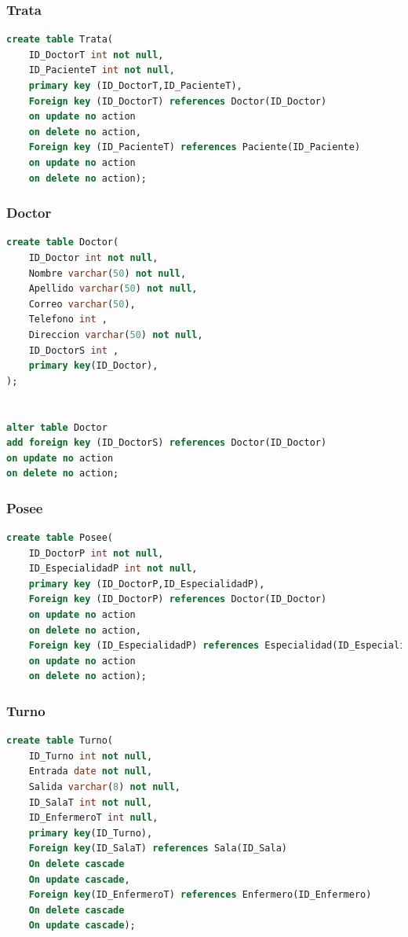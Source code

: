 \documentclass[10pt,letterpaper]{book}
\begin{document}
\subsubsection{Trata}
\begin{lstlisting}[language=sql]
create table Trata(
	ID_DoctorT int not null,
	ID_PacienteT int not null,
	primary key (ID_DoctorT,ID_PacienteT),
	Foreign key (ID_DoctorT) references Doctor(ID_Doctor)
	on update no action
	on delete no action,
	Foreign key (ID_PacienteT) references Paciente(ID_Paciente)
	on update no action
	on delete no action);
\end{lstlisting}
\subsubsection{Doctor}
\begin{lstlisting}[language=sql]
create table Doctor(
	ID_Doctor int not null,
	Nombre varchar(50) not null,
	Apellido varchar(50) not null,
	Correo varchar(50),
	Telefono int ,
	Direccion varchar(50) not null,
	ID_DoctorS int ,
	primary key(ID_Doctor),
);


alter table Doctor
add foreign key (ID_DoctorS) references Doctor(ID_Doctor)
on update no action
on delete no action;
\end{lstlisting}
\subsubsection{Posee}
\begin{lstlisting}[language=sql]
create table Posee(
	ID_DoctorP int not null,
	ID_EspecialidadP int not null,
	primary key (ID_DoctorP,ID_EspecialidadP),
	Foreign key (ID_DoctorP) references Doctor(ID_Doctor)
	on update no action
	on delete no action,
	Foreign key (ID_EspecialidadP) references Especialidad(ID_Especialidad)
	on update no action
	on delete no action);
\end{lstlisting}
\subsubsection{Turno}
\begin{lstlisting}[language=sql]
create table Turno(
	ID_Turno int not null,
	Entrada date not null,
	Salida varchar(8) not null,
	ID_SalaT int not null,
	ID_EnfermeroT int null,
	primary key(ID_Turno),
	Foreign key(ID_SalaT) references Sala(ID_Sala)
	On delete cascade
	On update cascade,
	Foreign key(ID_EnfermeroT) references Enfermero(ID_Enfermero)
	On delete cascade
	On update cascade);
\end{lstlisting}
\pagebreak
\end{document}
